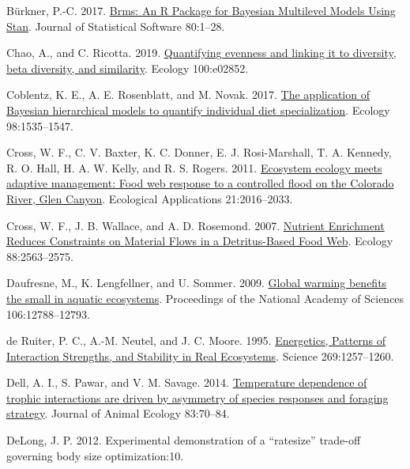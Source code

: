 \documentclass[
]{article}
\newlength{\cslhangindent}
\newlength{\cslentryspacingunit} %
\newenvironment{CSLReferences}[2] %
 {%
  \setlength{\parindent}{0pt}
  \ifodd #1
  \let\oldpar\par
  \def\par{\hangindent=\cslhangindent\oldpar}
  \fi
  \setlength{\parskip}{#2\cslentryspacingunit}
 }%
 {}
\begin{document}
\begin{CSLReferences}{1}{0}
\leavevmode{}%
Bürkner, P.-C. 2017. \href{https://doi.org/10.18637/jss.v080.i01}{Brms:
{An R Package} for {Bayesian Multilevel Models Using Stan}}. Journal of
Statistical Software 80:1--28.

\leavevmode{}%
Chao, A., and C. Ricotta. 2019.
\href{https://doi.org/10.1002/ecy.2852}{Quantifying evenness and linking
it to diversity, beta diversity, and similarity}. Ecology 100:e02852.

\leavevmode{}%
Coblentz, K. E., A. E. Rosenblatt, and M. Novak. 2017.
\href{https://doi.org/10.1002/ecy.1802}{The application of {Bayesian}
hierarchical models to quantify individual diet specialization}. Ecology
98:1535--1547.

\leavevmode{}%
Cross, W. F., C. V. Baxter, K. C. Donner, E. J. Rosi-Marshall, T. A.
Kennedy, R. O. Hall, H. A. W. Kelly, and R. S. Rogers. 2011.
\href{https://doi.org/10.1890/10-1719.1}{Ecosystem ecology meets
adaptive management: Food web response to a controlled flood on the
{Colorado River}, {Glen Canyon}}. Ecological Applications 21:2016--2033.

\leavevmode{}%
Cross, W. F., J. B. Wallace, and A. D. Rosemond. 2007.
\href{https://doi.org/10.1890/06-1348.1}{Nutrient {Enrichment Reduces
Constraints} on {Material Flows} in a {Detritus-Based Food Web}}.
Ecology 88:2563--2575.

\leavevmode{}%
Daufresne, M., K. Lengfellner, and U. Sommer. 2009.
\href{https://doi.org/10.1073/pnas.0902080106}{Global warming benefits
the small in aquatic ecosystems}. Proceedings of the National Academy of
Sciences 106:12788--12793.

\leavevmode{}%
de Ruiter, P. C., A.-M. Neutel, and J. C. Moore. 1995.
\href{https://doi.org/10.1126/science.269.5228.1257}{Energetics,
{Patterns} of {Interaction Strengths}, and {Stability} in {Real
Ecosystems}}. Science 269:1257--1260.

\leavevmode{}%
Dell, A. I., S. Pawar, and V. M. Savage. 2014.
\href{https://doi.org/10.1111/1365-2656.12081}{Temperature dependence of
trophic interactions are driven by asymmetry of species responses and
foraging strategy}. Journal of Animal Ecology 83:70--84.

\leavevmode{}%
DeLong, J. P. 2012. Experimental demonstration of a
{``rate\textendash size''} trade-off governing body size
optimization:10.


\end{CSLReferences}
\end{document}
